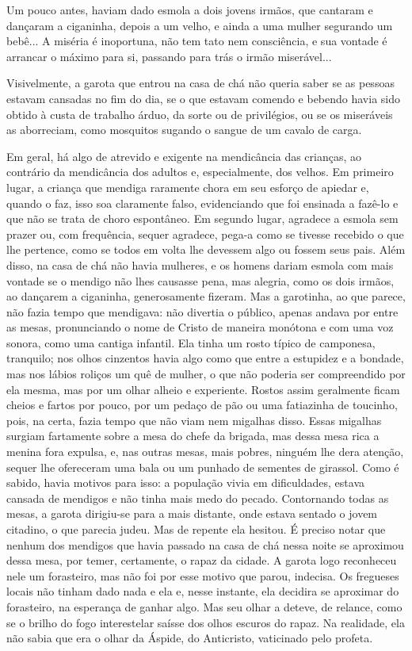 Um pouco antes, haviam dado esmola a dois jovens irmãos, que cantaram e
dançaram a ciganinha, depois a um velho, e ainda a uma mulher segurando
um bebê... A miséria é inoportuna, não tem tato nem consciência, e sua
vontade é arrancar o máximo para si, passando para trás o irmão
miserável...

Visivelmente, a garota que entrou na casa de chá não queria saber se as
pessoas estavam cansadas no fim do dia, se o que estavam comendo e
bebendo havia sido obtido à custa de trabalho árduo, da sorte ou de
privilégios, ou se os miseráveis as aborreciam, como mosquitos sugando o
sangue de um cavalo de carga.

Em geral, há algo de atrevido e exigente na mendicância das crianças, ao
contrário da mendicância dos adultos e, especialmente, dos velhos. Em
primeiro lugar, a criança que mendiga raramente chora em seu esforço de
apiedar e, quando o faz, isso soa claramente falso, evidenciando que foi
ensinada a fazê-lo e que não se trata de choro espontâneo. Em segundo
lugar, agradece a esmola sem prazer ou, com frequência, sequer agradece,
pega-a como se tivesse recebido o que lhe pertence, como se todos em
volta lhe devessem algo ou fossem seus pais. Além disso, na casa de chá
não havia mulheres, e os homens dariam esmola com mais vontade se o
mendigo não lhes causasse pena, mas alegria, como os dois irmãos, ao
dançarem a ciganinha, generosamente fizeram. Mas a garotinha, ao que
parece, não fazia tempo que mendigava: não divertia o público, apenas
andava por entre as mesas, pronunciando o nome de Cristo de maneira
monótona e com uma voz sonora, como uma cantiga infantil. Ela tinha um
rosto típico de camponesa, tranquilo; nos olhos cinzentos havia algo
como que entre a estupidez e a bondade, mas nos lábios roliços um quê de
mulher, o que não poderia ser compreendido por ela mesma, mas por um
olhar alheio e experiente. Rostos assim geralmente ficam cheios e fartos
por pouco, por um pedaço de pão ou uma fatiazinha de toucinho, pois, na
certa, fazia tempo que não viam nem migalhas disso. Essas migalhas
surgiam fartamente sobre a mesa do chefe da brigada, mas dessa mesa rica
a menina fora expulsa, e, nas outras mesas, mais pobres, ninguém lhe
dera atenção, sequer lhe ofereceram uma bala ou um punhado de sementes
de girassol. Como é sabido, havia motivos para isso: a população vivia
em dificuldades, estava cansada de mendigos e não tinha mais medo do
pecado. Contornando todas as mesas, a garota dirigiu-se para a mais
distante, onde estava sentado o jovem citadino, o que parecia judeu. Mas
de repente ela hesitou. É preciso notar que nenhum dos mendigos que
havia passado na casa de chá nessa noite se aproximou dessa mesa, por
temer, certamente, o rapaz da cidade. A garota logo reconheceu nele um
forasteiro, mas não foi por esse motivo que parou, indecisa. Os
fregueses locais não tinham dado nada e ela e, nesse instante, ela
decidira se aproximar do forasteiro, na esperança de ganhar algo. Mas
seu olhar a deteve, de relance, como se o brilho do fogo interestelar
saísse dos olhos escuros do rapaz. Na realidade, ela não sabia que era o
olhar da Áspide, do Anticristo, vaticinado pelo profeta.

